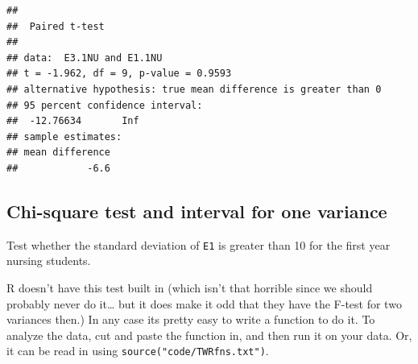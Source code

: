 \documentclass[
]{book}
\begin{document}
\begin{verbatim}
## 
##  Paired t-test
## 
## data:  E3.1NU and E1.1NU
## t = -1.962, df = 9, p-value = 0.9593
## alternative hypothesis: true mean difference is greater than 0
## 95 percent confidence interval:
##  -12.76634       Inf
## sample estimates:
## mean difference 
##            -6.6
\end{verbatim}

\hypertarget{chi-square-test-and-interval-for-one-variance}{%
\subsection{Chi-square test and interval for one variance}\label{chi-square-test-and-interval-for-one-variance}}

Test whether the standard deviation of \texttt{E1} is greater than 10 for the first year nursing students.

R doesn't have this test built in (which isn't that horrible since we should probably never do it\ldots{} but it does make it odd that they have the F-test for two variances then.) In any case its pretty easy to write a function to do it. To analyze the data, cut and paste the function in, and then run it on your data. Or, it can be read in using \texttt{source("code/TWRfns.txt")}.
\end{document}
